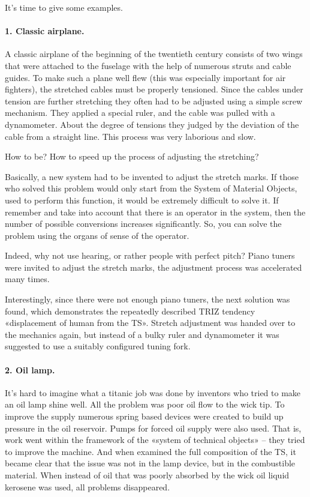 \documentclass[11pt,a4paper]{article}
\begin{document}
It's time to give some examples.


\paragraph{1. Classic airplane.}
A classic airplane of the beginning of the twentieth century consists of two
wings that were attached to the fuselage with the help of numerous struts and
cable guides. To make such a plane well flew (this was especially important
for air fighters), the stretched cables must be properly tensioned. Since the
cables under tension are further stretching they often had to be adjusted
using a simple screw mechanism. They applied a special ruler, and the cable
was pulled with a dynamometer. About the degree of tensions they judged by the
deviation of the cable from a straight line. This process was very laborious
and slow.

How to be? How to speed up the process of adjusting the stretching?

Basically, a new system had to be invented to adjust the stretch marks. If
those who solved this problem would only start from the System of Material
Objects, used to perform this function, it would be extremely difficult to
solve it. If remember and take into account that there is an operator in the
system, then the number of possible conversions increases significantly. So,
you can solve the problem using the organs of sense of the operator.

Indeed, why not use hearing, or rather people with perfect pitch? Piano tuners
were invited to adjust the stretch marks, the adjustment process was
accelerated many times.

Interestingly, since there were not enough piano tuners, the next solution was
found, which demonstrates the repeatedly described TRIZ tendency «displacement
of human from the TS». Stretch adjustment was handed over to the mechanics
again, but instead of a bulky ruler and dynamometer it was suggested to use a
suitably configured tuning fork.

\paragraph{2. Oil lamp.}
It's hard to imagine what a titanic job was done by inventors who tried to
make an oil lamp shine well. All the problem was poor oil flow to the wick
tip. To improve the supply numerous spring based devices were created to build
up pressure in the oil reservoir. Pumps for forced oil supply were also used.
That is, work went within the framework of the «system of technical objects»
-- they tried to improve the machine. And when examined the full composition
of the TS, it became clear that the issue was not in the lamp device, but in
the combustible material. When instead of oil that was poorly absorbed by the
wick oil liquid kerosene was used, all problems disappeared.
\end{document}

